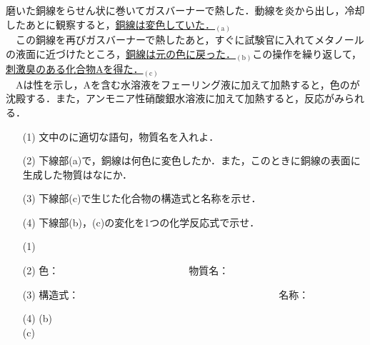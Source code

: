 \documentclass[a4paper,12pt]{ltjsreport}
\begin{document}
\begin{que}
磨いた銅線をらせん状に巻いてガスバーナーで熱した．動線を炎から出し，冷却したあとに観察すると，\underline{銅線は変色していた．}$_{(\mathrm{a})}$\\
　この銅線を再びガスバーナーで熱したあと，すぐに試験官に入れてメタノールの液面に近づけたところ，\underline{銅線は元の色に戻った．}$_{(\mathrm{b})}$この操作を繰り返して，\underline{刺激臭のある化合物Aを得た．}$_{(\mathrm{c})}$\\
　Aは性を示し，Aを含む水溶液をフェーリング液に加えて加熱すると，色のが沈殿する．また，アンモニア性硝酸銀水溶液に加えて加熱すると，反応がみられる．
\begin{itemize}
    \item [(1)]文中の\fbox{　}に適切な語句，物質名を入れよ．
    \item [(2)]下線部(a)で，銅線は何色に変色したか．また，このときに銅線の表面に生成した物質はなにか．
    \item [(3)]下線部(c)で生じた化合物の構造式と名称を示せ．
    \item [(4)]下線部(b)，(c)の変化を1つの化学反応式で示せ．
\end{itemize}
\end{que}
\ans 
\begin{itemize}
    \item[(1)]　\\[20pt]
    \item [(2)]色：　　　　　　　　　　　　　物質名：\\
    \item [(3)]構造式：　　　　　　　　　　　　　　　　　　　　名称：\\[70pt]
    \item [(4)](b)\\[20pt]
    (c)
\end{itemize}
\end{document}
